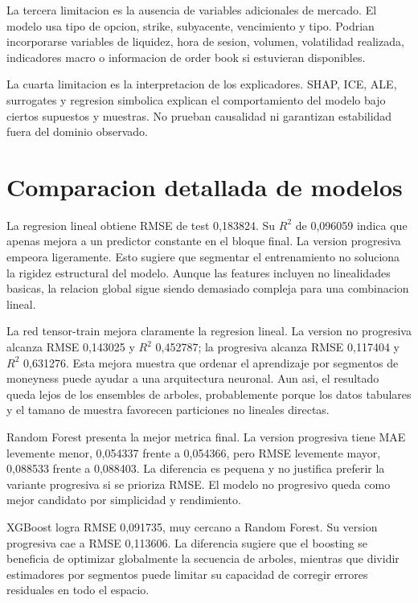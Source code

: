 La tercera limitacion es la ausencia de variables adicionales de mercado. El modelo usa tipo de opcion, strike, subyacente, vencimiento y tipo. Podrian incorporarse variables de liquidez, hora de sesion, volumen, volatilidad realizada, indicadores macro o informacion de order book si estuvieran disponibles.

La cuarta limitacion es la interpretacion de los explicadores. SHAP, ICE, ALE, surrogates y regresion simbolica explican el comportamiento del modelo bajo ciertos supuestos y muestras. No prueban causalidad ni garantizan estabilidad fuera del dominio observado.

\section{Comparacion detallada de modelos}

La regresion lineal obtiene RMSE de test 0,183824. Su $R^2$ de 0,096059 indica que apenas mejora a un predictor constante en el bloque final. La version progresiva empeora ligeramente. Esto sugiere que segmentar el entrenamiento no soluciona la rigidez estructural del modelo. Aunque las features incluyen no linealidades basicas, la relacion global sigue siendo demasiado compleja para una combinacion lineal.

La red tensor-train mejora claramente la regresion lineal. La version no progresiva alcanza RMSE 0,143025 y $R^2$ 0,452787; la progresiva alcanza RMSE 0,117404 y $R^2$ 0,631276. Esta mejora muestra que ordenar el aprendizaje por segmentos de moneyness puede ayudar a una arquitectura neuronal. Aun asi, el resultado queda lejos de los ensembles de arboles, probablemente porque los datos tabulares y el tamano de muestra favorecen particiones no lineales directas.

Random Forest presenta la mejor metrica final. La version progresiva tiene MAE levemente menor, 0,054337 frente a 0,054366, pero RMSE levemente mayor, 0,088533 frente a 0,088403. La diferencia es pequena y no justifica preferir la variante progresiva si se prioriza RMSE. El modelo no progresivo queda como mejor candidato por simplicidad y rendimiento.

XGBoost logra RMSE 0,091735, muy cercano a Random Forest. Su version progresiva cae a RMSE 0,113606. La diferencia sugiere que el boosting se beneficia de optimizar globalmente la secuencia de arboles, mientras que dividir estimadores por segmentos puede limitar su capacidad de corregir errores residuales en todo el espacio.

